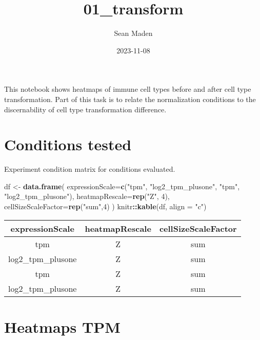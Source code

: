 \documentclass[
]{article}
\title{01\_transform}
\author{Sean Maden}
\date{2023-11-08}
\newenvironment{Shaded}{\begin{snugshade}}{\end{snugshade}}
\newcommand{\AttributeTok}[1]{\textcolor[rgb]{0.13,0.29,0.53}{#1}}
\newcommand{\DecValTok}[1]{\textcolor[rgb]{0.00,0.00,0.81}{#1}}
\newcommand{\FunctionTok}[1]{\textcolor[rgb]{0.13,0.29,0.53}{\textbf{#1}}}
\newcommand{\NormalTok}[1]{#1}
\newcommand{\OtherTok}[1]{\textcolor[rgb]{0.56,0.35,0.01}{#1}}
\newcommand{\SpecialCharTok}[1]{\textcolor[rgb]{0.81,0.36,0.00}{\textbf{#1}}}
\newcommand{\StringTok}[1]{\textcolor[rgb]{0.31,0.60,0.02}{#1}}
\begin{document}
\maketitle

This notebook shows heatmaps of immune cell types before and after cell
type transformation. Part of this task is to relate the normalization
conditions to the discernability of cell type transformation difference.

\hypertarget{conditions-tested}{%
\section{Conditions tested}\label{conditions-tested}}

Experiment condition matrix for conditions evaluated.

\begin{Shaded}
\begin{Highlighting}[]
\NormalTok{df }\OtherTok{\textless{}{-}} \FunctionTok{data.frame}\NormalTok{(}
  \AttributeTok{expressionScale=}\FunctionTok{c}\NormalTok{(}\StringTok{"tpm"}\NormalTok{, }\StringTok{"log2\_tpm\_plusone"}\NormalTok{, }\StringTok{"tpm"}\NormalTok{, }\StringTok{"log2\_tpm\_plusone"}\NormalTok{),}
  \AttributeTok{heatmapRescale=}\FunctionTok{rep}\NormalTok{(}\StringTok{"Z"}\NormalTok{, }\DecValTok{4}\NormalTok{),}
  \AttributeTok{cellSizeScaleFactor=}\FunctionTok{rep}\NormalTok{(}\StringTok{"sum"}\NormalTok{,}\DecValTok{4}\NormalTok{)}
\NormalTok{)}
\NormalTok{knitr}\SpecialCharTok{::}\FunctionTok{kable}\NormalTok{(df, }\AttributeTok{align =} \StringTok{"c"}\NormalTok{)}
\end{Highlighting}
\end{Shaded}

\begin{longtable}[]{@{}ccc@{}}
\toprule\noalign{}
expressionScale & heatmapRescale & cellSizeScaleFactor \\
\midrule\noalign{}
\endhead
\bottomrule\noalign{}
\endlastfoot
tpm & Z & sum \\
log2\_tpm\_plusone & Z & sum \\
tpm & Z & sum \\
log2\_tpm\_plusone & Z & sum \\
\end{longtable}

\hypertarget{heatmaps-tpm}{%
\section{Heatmaps TPM}\label{heatmaps-tpm}}
\end{document}
